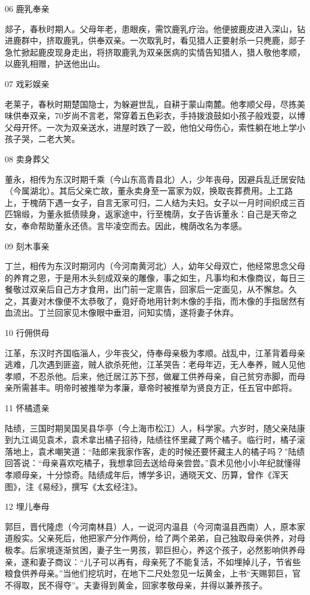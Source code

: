 \documentclass[12pt,a4paper]{article}
\begin{document}
06 鹿乳奉亲

郯子，春秋时期人。父母年老，患眼疾，需饮鹿乳疗治。他便披鹿皮进入深山，钻进鹿群中，挤取鹿乳，供奉双亲。一次取乳时，看见猎人正要射杀一只麂鹿，郯子急忙掀起鹿皮现身走出，将挤取鹿乳为双亲医病的实情告知猎人，猎人敬他孝顺，以鹿乳相赠，护送他出山。

07 戏彩娱亲

老莱子，春秋时期楚国隐士，为躲避世乱，自耕于蒙山南麓。他孝顺父母，尽拣美味供奉双亲，70岁尚不言老，常穿着五色彩衣，手持拨浪鼓如小孩子般戏耍，以博父母开怀。一次为双亲送水，进屋时跌了一跤，他怕父母伤心，索性躺在地上学小孩子哭，二老大笑。

08 卖身葬父

董永，相传为东汉时期千乘（今山东高青县北）人，少年丧母，因避兵乱迁居安陆（今属湖北）。其后父亲亡故，董永卖身至一富家为奴，换取丧葬费用。上工路上，于槐荫下遇一女子，自言无家可归，二人结为夫妇。女子以一月时间织成三百匹锦缎，为董永抵债赎身，返家途中，行至槐荫，女子告诉董永：自己是天帝之女，奉命帮助董永还债。言毕凌空而去。因此，槐荫改名为孝感。

09 刻木事亲

丁兰，相传为东汉时期河内（今河南黄河北）人，幼年父母双亡，他经常思念父母的养育之恩，于是用木头刻成双亲的雕像，事之如生，凡事均和木像商议，每日三餐敬过双亲后自己方才食用，出门前一定禀告，回家后一定面见，从不懈怠。久之，其妻对木像便不太恭敬了，竟好奇地用针刺木像的手指，而木像的手指居然有血流出。丁兰回家见木像眼中垂泪，问知实情，遂将妻子休弃。

10 行佣供母

江革，东汉时齐国临淄人，少年丧父，侍奉母亲极为孝顺。战乱中，江革背着母亲逃难，几次遇到匪盗，贼人欲杀死他，江革哭告：老母年迈，无人奉养，贼人见他孝顺，不忍杀他。后来，他迁居江苏下邳，做雇工供养母亲，自己贫穷赤脚，而母亲所需甚丰。明帝时被推举为孝廉，章帝时被推举为贤良方正，任五官中郎将。

11 怀橘遗亲

陆绩，三国时期吴国吴县华亭（今上海市松江）人，科学家。六岁时，随父亲陆康到九江谒见袁术，袁术拿出橘子招待，陆绩往怀里藏了两个橘子。临行时，橘子滚落地上，袁术嘲笑道：“陆郎来我家作客，走的时候还要怀藏主人的橘子吗？”陆绩回答说：“母亲喜欢吃橘子，我想拿回去送给母亲尝尝。”袁术见他小小年纪就懂得孝顺母亲，十分惊奇。陆绩成年后，博学多识，通晓天文、历算，曾作《浑天图》，注《易经》，撰写《太玄经注》。

12 埋儿奉母

郭巨，晋代隆虑（今河南林县）人，一说河内温县（今河南温县西南）人，原本家道殷实。父亲死后，他把家产分作两份，给了两个弟弟，自己独取母亲供养，对母极孝。后家境逐渐贫困，妻子生一男孩，郭巨担心，养这个孩子，必然影响供养母亲，遂和妻子商议：“儿子可以再有，母亲死了不能复活，不如埋掉儿子，节省些粮食供养母亲。”当他们挖坑时，在地下二尺处忽见一坛黄金，上书“天赐郭巨，官不得取，民不得夺”。夫妻得到黄金，回家孝敬母亲，并得以兼养孩子。
\end{document}
